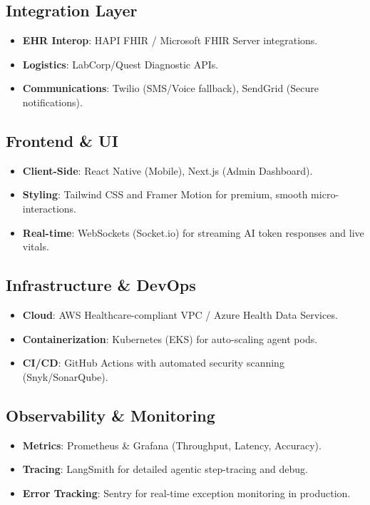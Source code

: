 \documentclass[12pt,a4paper]{article}
\begin{document}
\subsection{Integration Layer}
\begin{itemize}
    \item \textbf{EHR Interop}: HAPI FHIR / Microsoft FHIR Server integrations.
    \item \textbf{Logistics}: LabCorp/Quest Diagnostic APIs.
    \item \textbf{Communications}: Twilio (SMS/Voice fallback), SendGrid (Secure notifications).
\end{itemize}

\subsection{Frontend \& UI}
\begin{itemize}
    \item \textbf{Client-Side}: React Native (Mobile), Next.js (Admin Dashboard).
    \item \textbf{Styling}: Tailwind CSS and Framer Motion for premium, smooth micro-interactions.
    \item \textbf{Real-time}: WebSockets (Socket.io) for streaming AI token responses and live vitals.
\end{itemize}

\subsection{Infrastructure \& DevOps}
\begin{itemize}
    \item \textbf{Cloud}: AWS Healthcare-compliant VPC / Azure Health Data Services.
    \item \textbf{Containerization}: Kubernetes (EKS) for auto-scaling agent pods.
    \item \textbf{CI/CD}: GitHub Actions with automated security scanning (Snyk/SonarQube).
\end{itemize}

\subsection{Observability \& Monitoring}
\begin{itemize}
    \item \textbf{Metrics}: Prometheus \& Grafana (Throughput, Latency, Accuracy).
    \item \textbf{Tracing}: LangSmith for detailed agentic step-tracing and debug.
    \item \textbf{Error Tracking}: Sentry for real-time exception monitoring in production.
\end{itemize}
\end{document}
